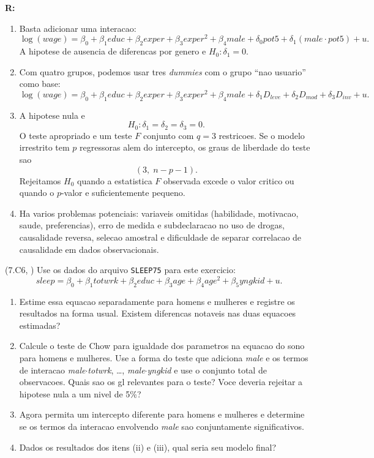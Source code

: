 \documentclass[12pt,letterpaper, onecolumn]{exam}
\renewenvironment{solution}
{\par\noindent\textbf{R:}\enspace\color{blue}}
{\par\color{black}}
\begin{document}
\begin{questions}
\begin{solution}
\begin{enumerate}[label=(\roman*)]
    \item Basta adicionar uma interacao:
    \[
    \log(wage)=\beta_0+\beta_1 educ+\beta_2 exper+\beta_3 exper^2+\beta_4 male+\delta_0 pot5+\delta_1(male\cdot pot5)+u.
    \]
    A hipotese de ausencia de diferencas por genero e \(H_0:\delta_1=0\).

    \item Com quatro grupos, podemos usar tres \textit{dummies} com o grupo ``nao usuario'' como base:
    \[
    \log(wage)=\beta_0+\beta_1 educ+\beta_2 exper+\beta_3 exper^2+\beta_4 male+\delta_1 D_{leve}+\delta_2 D_{mod}+\delta_3 D_{inv}+u.
    \]

    \item A hipotese nula e
    \[
    H_0:\delta_1=\delta_2=\delta_3=0.
    \]
    O teste apropriado e um teste \(F\) conjunto com \(q=3\) restricoes. Se o modelo irrestrito tem \(p\) regressoras alem do intercepto, os graus de liberdade do teste sao
    \[
    (3,\; n-p-1).
    \]
    Rejeitamos \(H_0\) quando a estatistica \(F\) observada excede o valor critico ou quando o \(p\)-valor e suficientemente pequeno.

    \item Ha varios problemas potenciais: variaveis omitidas (habilidade, motivacao, saude, preferencias), erro de medida e subdeclaracao no uso de drogas, causalidade reversa, selecao amostral e dificuldade de separar correlacao de causalidade em dados observacionais.
\end{enumerate}
\end{solution}

\vspace{0.7cm}

\question\qstar (7.C6, \citep{wooldridge2016}) Use os dados do arquivo \texttt{SLEEP75} para este exercicio:
\[
sleep = \beta_0 + \beta_1 totwrk + \beta_2 educ + \beta_3 age + \beta_4 age^2 + \beta_5 yngkid + u.
\]
\begin{enumerate}[label=(\roman*)]
    \item Estime essa equacao separadamente para homens e mulheres e registre os resultados na forma usual. Existem diferencas notaveis nas duas equacoes estimadas?
    \item Calcule o teste de Chow para igualdade dos parametros na equacao do sono para homens e mulheres. Use a forma do teste que adiciona \textit{male} e os termos de interacao \textit{male}$\cdot$\textit{totwrk}, \ldots, \textit{male}$\cdot$\textit{yngkid} e use o conjunto total de observacoes. Quais sao os gl relevantes para o teste? Voce deveria rejeitar a hipotese nula a um nivel de 5\%?
    \item Agora permita um intercepto diferente para homens e mulheres e determine se os termos da interacao envolvendo \textit{male} sao conjuntamente significativos.
    \item Dados os resultados dos itens (ii) e (iii), qual seria seu modelo final?
\end{enumerate}

\end{questions}


\end{document}
